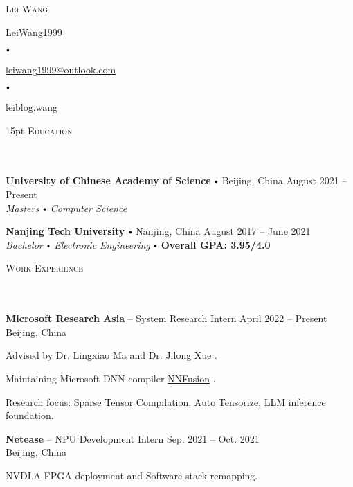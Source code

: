 \documentclass{article}
\newcommand{\contact}[3]{
\vspace*{5pt}
\begin{center}
{\LARGE \scshape {#1}}\\
\vspace{3pt}
#2 
\vspace{2pt}
#3
\end{center}
\vspace*{-8pt}
}
\newcommand{\header}[1]{{
\hspace*{-15pt}\vspace*{6pt} \textsc{#1}} \vspace*{-6pt} 
\lineunder
}
\newcommand{\lineunder}{
\vspace*{-8pt} \\ \hspace*{-18pt} 
\hrulefill \\
}
\newcommand{\school}[4]{
\textbf{#1} \labelitemi #2 \hfill #3 \\ #4 \vspace*{5pt}
}
\newcommand{\employer}[4]{{
\vspace*{2pt}%
\textbf{#1} #2 \hfill #3\\ #4 \vspace*{2pt}}
}
\renewcommand{\labelitemi}{
$\vcenter{\hbox{\tiny$\bullet$}}$\hspace*{3pt}
}
\renewcommand{\labelitemii}{
$\vcenter{\hbox{\tiny$\bullet$}}$\hspace*{-3pt}
}
\newcommand{\myhref}[2]{%
\href{#1}{\textcolor{ColorTwo}{#2}}
}
\newenvironment{bullet-list-minor}{
\begin{list}{\labelitemii}{\setlength\leftmargin{15pt} 
\topsep 0pt \itemsep -2pt}}{\vspace*{4pt}\end{list}
}
\begin{document}
\small
\smallskip
\vspace*{-44pt}

\contact{Lei Wang}
{
\textcolor{ColorTwo}{\faGithub} 
\myhref{https://github.com/LeiWang1999}{LeiWang1999} 
\labelitemi 
\textcolor{ColorTwo}{\faEnvelopeO} 
\myhref{mailto:leiwang1999@outlook.com}{leiwang1999@outlook.com}
\labelitemi
\textcolor{ColorTwo}{\faChain} 
\myhref{https://leiblog.wang}{leiblog.wang}
}

\vspace{15pt}
\header{Education}
    \school{University of Chinese Academy of Science}{Beijing, China}{August 2021 -- Present}
    {\textit{Masters \labelitemi Computer Science}}

    \school{Nanjing Tech University}{Nanjing, China}{August 2017 -- June 2021}
    {\textit{Bachelor \labelitemi Electronic Engineering} \labelitemi \textcolor{ColorOne}{\textbf{Overall GPA: 3.95/4.0}}}

\vspace*{4pt}%
\header{Work Experience}
    \employer{Microsoft Research Asia}{-- System Research Intern}{April 2022 -- Present}{Beijing, China}
	\begin{bullet-list-minor}
	\item Advised by \myhref{https://xysmlx.github.io/}{Dr. Lingxiao Ma} and \myhref{https://www.microsoft.com/en-us/research/people/jxue/}{Dr. Jilong Xue}.
	\item Maintaining Microsoft DNN compiler \myhref{https://github.com/microsoft/nnfusion}{NNFusion}.
	\item Research focus: Sparse Tensor Compilation, Auto Tensorize, LLM inference foundation.   
    \end{bullet-list-minor}

    \employer{Netease}{-- NPU Development Intern}{Sep. 2021 -- Oct. 2021}{Beijing, China}
	\begin{bullet-list-minor}
	\item NVDLA FPGA deployment and Software stack remapping.
    \end{bullet-list-minor}
\end{document}
